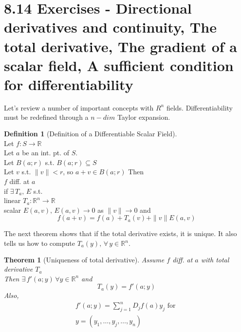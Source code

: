 \documentclass[twoside]{amsart}
\theoremstyle{plain}
\newtheorem{theorem}{Theorem}
\theoremstyle{definition}
\newtheorem{definition}{Definition}
\begin{document}
\section*{ 8.14 Exercises - Directional derivatives and continuity, The total derivative, The gradient of a scalar field, A sufficient condition for differentiability } 

Let's review a number of important concepts with $R^n$ fields.  Differentiability must be redefined through a $n-dim$ Taylor expansion.    

\begin{definition}[Definition of a Differentiable Scalar Field] \quad \\
Let $f:S \to \mathbb{R}$ \\
Let $a$ be an int. pt. of $S$.  \\
Let $B(a;r)$ s.t. $B(a;r) \subseteq S$ \\
Let $v$ s.t. $\| v \| < r$, so $a+v \in B(a;r)$  Then \medskip \\
$f$ diff. at $a$ \\
\phantom{ f diff} if $\exists \, T_a, \, E$ s.t. \\
\phantom{ f diff if } linear $T_a:\mathbb{R}^n \to \mathbb{R}$ \\
\phantom{ f diff if } scalar $E(a,v), \, E(a,v) \to 0$ as $\| v \| \to 0$  and 
\begin{equation}
  f(a+v) = f(a) + T_a(v) + \| v\| E(a,v)
\end{equation}
\end{definition}

The next theorem shows that if the total derivative exists, it is unique.  It also tells us how to compute $T_a(y), \, \forall \, y \in \mathbb{R}^n$.  

\begin{theorem}[Uniqueness of total derivative]
Assume $f$ diff. at $a$ with total derivative $T_a$ \\
\phantom{Assu} Then $\exists \, f'(a;y) \, \forall y \in \mathbb{R}^n$ and 
\[
T_a(y) = f'(a;y)
\]
Also, 
\[
\begin{gathered}
  f'(a;y) = \sum_{j=1}^{n} D_j f(a) y_j \text{ for } \\
  y = (y_1 , \dots , y_j , \dots , y_n) 
\end{gathered}
\]
\end{theorem}
\end{document}
